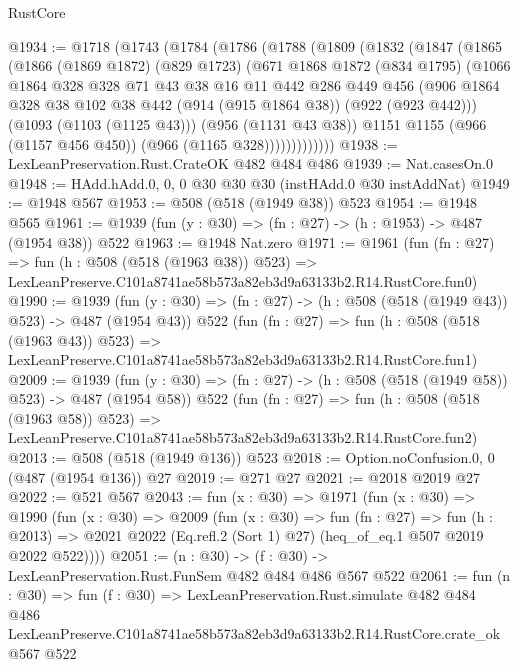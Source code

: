 \begin{lexlean}{RustCore}
\begin{coremodule}
@1934 := @1718
    (@1743
      (@1784
        (@1786
          (@1788
            (@1809
              (@1832
                (@1847
                  (@1865
                    (@1866
                      (@1869 @1872)
                      (@829 @1723)
                      (@671
                        @1868
                        @1872
                        (@834 @1795)
                        (@1066
                          @1864
                          @328
                          @328
                          @71
                          @43
                          @38
                          @16
                          @11
                          @442
                          @286
                          @449
                          @456
                          (@906
                            @1864
                            @328
                            @38
                            @102
                            @38
                            @442
                            (@914 (@915 @1864 @38))
                            (@922 (@923 @442)))
                          (@1093 (@1103 (@1125 @43)))
                          (@956 (@1131 @43 @38))
                          @1151
                          @1155
                          (@966 (@1157 @456 @450))
                          (@966 (@1165 @328)))))))))))))
@1938 := LexLeanPreservation.Rust.CrateOK @482 @484 @486
@1939 := Nat.casesOn.{0}
@1948 := HAdd.hAdd.{0, 0, 0} @30 @30 @30 (instHAdd.{0} @30 instAddNat)
@1949 := @1948 @567
@1953 := @508 (@518 (@1949 @38)) @523
@1954 := @1948 @565
@1961 := @1939 (fun (y : @30) => (fn : @27) -> (h : @1953) -> @487 (@1954 @38)) @522
@1963 := @1948 Nat.zero
@1971 := @1961
    (fun (fn : @27) =>
    fun (h : @508 (@518 (@1963 @38)) @523) =>
    LexLeanPreserve.C101a8741ae58b573a82eb3d9a63133b2.R14.RustCore.fun0)
@1990 := @1939
    (fun (y : @30) => (fn : @27) -> (h : @508 (@518 (@1949 @43)) @523) -> @487 (@1954 @43))
    @522
    (fun (fn : @27) =>
    fun (h : @508 (@518 (@1963 @43)) @523) =>
    LexLeanPreserve.C101a8741ae58b573a82eb3d9a63133b2.R14.RustCore.fun1)
@2009 := @1939
    (fun (y : @30) => (fn : @27) -> (h : @508 (@518 (@1949 @58)) @523) -> @487 (@1954 @58))
    @522
    (fun (fn : @27) =>
    fun (h : @508 (@518 (@1963 @58)) @523) =>
    LexLeanPreserve.C101a8741ae58b573a82eb3d9a63133b2.R14.RustCore.fun2)
@2013 := @508 (@518 (@1949 @136)) @523
@2018 := Option.noConfusion.{0, 0} (@487 (@1954 @136)) @27
@2019 := @271 @27
@2021 := @2018 @2019 @27
@2022 := @521 @567
@2043 := fun (x : @30) =>
  @1971
    (fun (x : @30) =>
    @1990
      (fun (x : @30) =>
      @2009
        (fun (x : @30) =>
        fun (fn : @27) =>
        fun (h : @2013) =>
        @2021 @2022 (Eq.refl.{2} (Sort 1) @27) (heq_of_eq.{1} @507 @2019 @2022 @522))))
@2051 := (n : @30) -> (f : @30) -> LexLeanPreservation.Rust.FunSem @482 @484 @486 @567 @522
@2061 := fun (n : @30) =>
  fun (f : @30) =>
  LexLeanPreservation.Rust.simulate
    @482
    @484
    @486
    LexLeanPreserve.C101a8741ae58b573a82eb3d9a63133b2.R14.RustCore.crate_ok
    @567
    @522
\end{coremodule}
\end{lexlean}
